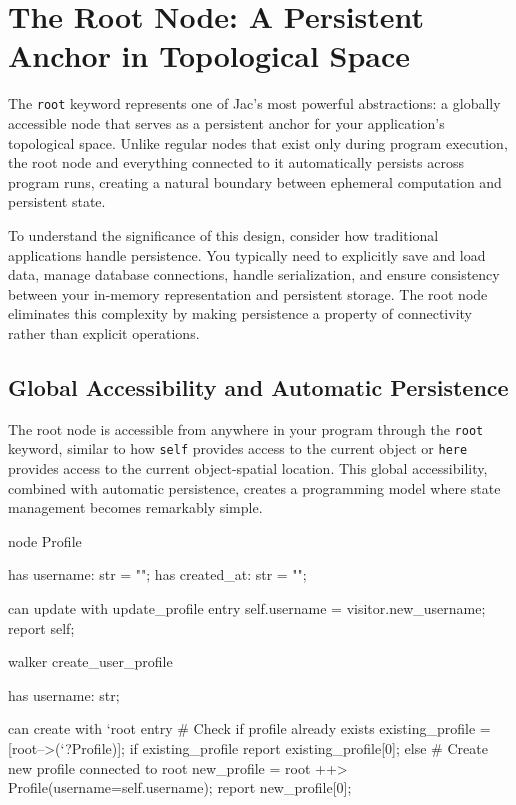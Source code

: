 \section{The Root Node: A Persistent Anchor in Topological Space}

The \texttt{root} keyword represents one of Jac's most powerful abstractions: a globally accessible node that serves as a persistent anchor for your application's topological space. Unlike regular nodes that exist only during program execution, the root node and everything connected to it automatically persists across program runs, creating a natural boundary between ephemeral computation and persistent state.

To understand the significance of this design, consider how traditional applications handle persistence. You typically need to explicitly save and load data, manage database connections, handle serialization, and ensure consistency between your in-memory representation and persistent storage. The root node eliminates this complexity by making persistence a property of connectivity rather than explicit operations.

\subsection{Global Accessibility and Automatic Persistence}

The root node is accessible from anywhere in your program through the \texttt{root} keyword, similar to how \texttt{self} provides access to the current object or \texttt{here} provides access to the current object-spatial location. This global accessibility, combined with automatic persistence, creates a programming model where state management becomes remarkably simple.

\begin{jacblock}
node Profile {
    has username: str = "";
    has created_at: str = "";

    can update with update_profile entry {
        self.username = visitor.new_username;
        report self;
    }
}

walker create_user_profile {
    has username: str;

    can create with `root entry {
        # Check if profile already exists
        existing_profile = [root-->(`?Profile)];
        if existing_profile {
            report existing_profile[0];
        } else {
            # Create new profile connected to root
            new_profile = root ++> Profile(username=self.username);
            report new_profile[0];
        }
    }
}
\end{jacblock}

